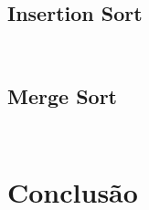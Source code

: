 \documentclass[12pt, oneside, a4paper,english,brazil]{abntex2}
\begin{document}
\inputminted{lean}{declarations.lean}
\section{Insertion Sort}
\inputminted{lean}{insertion_sort.lean}
\inputminted{lean}{insertion_sort_modified.lean}

\section{Merge Sort}

\inputminted{lean}{merge_sort.lean}
\inputminted{lean}{merge_sort_modified.lean}

\chapter{Conclus\~ao}

\postextual

% 

\end{document}
